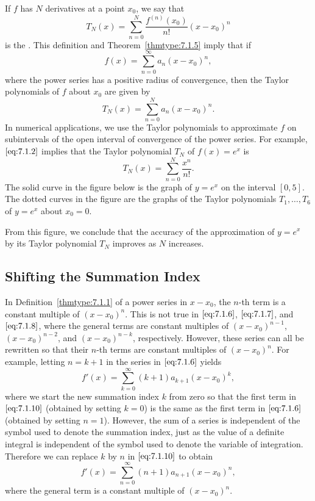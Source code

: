 \documentclass{ximera}
\begin{document}
If $f$ has $N$ derivatives at a point $x_0$, we say that
$$
T_N(x)=\sum_{n=0}^N\frac{f^{(n)}(x_0)}{n!}(x-x_0)^n
$$
is the
.
This definition and Theorem~\ref{thmtype:7.1.5} imply that if
$$
f(x)=\sum_{n=0}^\infty a_n(x-x_0)^n,
$$
where the power series has a positive radius of convergence,
then the Taylor polynomials of $f$ about $x_0$ are given by
$$
T_N(x)=\sum_{n=0}^N a_n(x-x_0)^n.
$$
In numerical applications, we use the Taylor polynomials to
approximate $f$ on subintervals of the open interval of convergence of
the power series. For example,  $\eqref{eq:7.1.2}$ implies that the Taylor polynomial $T_N$ of $f(x)=e^x$ is
$$
T_N(x)=\sum_{n=0}^N\frac{x^n}{n!}.
$$
The solid curve in the figure below is the graph
of $y=e^x$ on the interval $[0,5]$. The  dotted curves
in the figure are the graphs of the Taylor polynomials
$T_1, \dots, T_6$ of $y=e^x$ about $x_0=0$. 


\begin{center}
\end{center}


From this figure, we conclude
that the accuracy of the
approximation of $y=e^x$ by its Taylor polynomial $T_N$ improves as $N$ increases.

\subsection*{Shifting the Summation Index}

In Definition~\ref{thmtype:7.1.1} of a power series in $x-x_0$, the $n$-th
term is a constant multiple of $(x-x_0)^n$. This is not true in
$\eqref{eq:7.1.6}$, $\eqref{eq:7.1.7}$, and $\eqref{eq:7.1.8}$, where the general terms are constant multiples of $(x-x_0)^{n-1}$, $(x-x_0)^{n-2}$, and
$(x-x_0)^{n-k}$, respectively. However, these series can all be
rewritten so that their $n$-th terms are constant multiples of
$(x-x_0)^n$. For example, letting $n=k+1$ in the series in
$\eqref{eq:7.1.6}$ yields
\begin{equation} \label{eq:7.1.10}
f'(x)=\sum_{k=0}^\infty (k+1)a_{k+1}(x-x_0)^k,
\end{equation}
where we start the new summation index $k$ from zero so that the first term in $\eqref{eq:7.1.10}$ (obtained by setting $k=0$) is the same as the
first term in $\eqref{eq:7.1.6}$ (obtained by setting $n=1$). However, the
sum of a series is independent of the symbol used to denote the
summation index, just as the value of a definite integral is
independent of the symbol used to denote the variable of integration.
Therefore we can replace $k$ by $n$ in $\eqref{eq:7.1.10}$ to obtain
\begin{equation} \label{eq:7.1.11}
f'(x)=\sum_{n=0}^\infty (n+1)a_{n+1}(x-x_0)^n,
\end{equation}
where the general term is a  constant multiple of  $(x-x_0)^n$.
\end{document}
